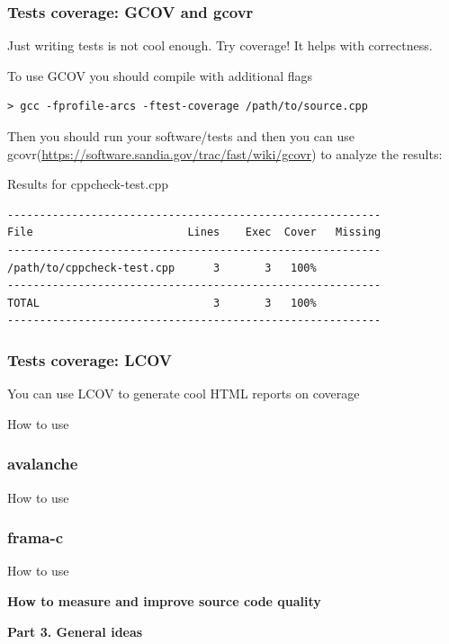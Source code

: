 \documentclass{beamer}
\begin{document}
\begin{frame}[fragile]
\frametitle{Tests coverage: GCOV and gcovr}
Just writing tests is not cool enough. Try coverage! It helps with correctness.
\begin{exampleblock}{To use GCOV you should compile with additional flags}
\begin{Verbatim}[fontsize=\small]
> gcc -fprofile-arcs -ftest-coverage /path/to/source.cpp
\end{Verbatim}
\end{exampleblock}
Then you should run your software/tests and then you can use gcovr(\url{https://software.sandia.gov/trac/fast/wiki/gcovr}) to analyze the results:
\begin{exampleblock}{Results for cppcheck-test.cpp}
\begin{Verbatim}[fontsize=\small]
----------------------------------------------------------
File                        Lines    Exec  Cover   Missing
----------------------------------------------------------
/path/to/cppcheck-test.cpp      3       3   100%   
----------------------------------------------------------
TOTAL                           3       3   100%
----------------------------------------------------------
\end{Verbatim}
\end{exampleblock}
\end{frame}

\begin{frame}
\frametitle{Tests coverage: LCOV}
You can use LCOV to generate cool HTML reports on coverage
\begin{exampleblock}{How to use}
\end{exampleblock}
\end{frame}

\begin{frame}
\frametitle{avalanche}
\begin{exampleblock}{How to use}
\end{exampleblock}
\end{frame}

\begin{frame}
\frametitle{frama-c}
\begin{exampleblock}{How to use}
\end{exampleblock}
\end{frame}

\begin{frame}
\begin{block}{\begin{center}\Large\textbf{How to measure and improve source code quality}\end{center}}
\begin{center}
\textbf{Part 3. General ideas}
\end{center}
\end{block}
\end{frame}
\end{document}
